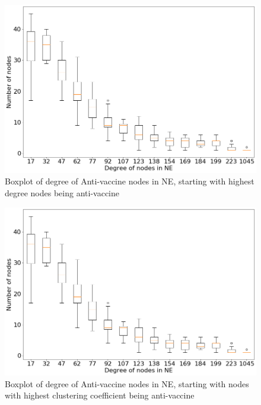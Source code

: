 \begin{figure}[H]
    \centering
    \includegraphics[width=12cm]{figs/exp3-degree.png}
    \caption{Boxplot of degree of Anti-vaccine nodes in NE, starting with highest degree nodes being anti-vaccine}
    \label{fig:exp3-degree}
\end{figure}

\begin{figure}[H]
    \centering
    \includegraphics[width=12cm]{figs/exp3-degree.png}
    \caption{Boxplot of degree of Anti-vaccine nodes in NE, starting with nodes with highest clustering coefficient being anti-vaccine}
    \label{fig:exp3-cluster}
\end{figure}





